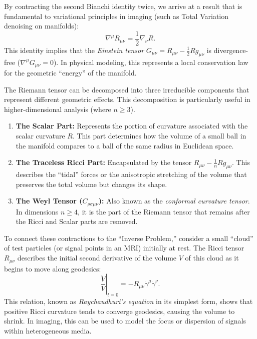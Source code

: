 By contracting the second Bianchi identity twice, we arrive at a result that is fundamental to variational principles in imaging (such as Total Variation denoising on manifolds):
\begin{equation}
  \nabla^\mu R_{\mu\nu} = \frac{1}{2} \nabla_\nu R
.\end{equation}
This identity implies that the \emph{Einstein tensor} $G_{\mu\nu} = R_{\mu\nu} - \frac{1}{2}Rg_{\mu\nu}$ is divergence-free ($\nabla^\mu G_{\mu\nu} = 0$). In physical modeling, this represents a local conservation law for the geometric ``energy'' of the manifold.

The Riemann tensor can be decomposed into three irreducible components that represent different geometric effects. This decomposition is particularly useful in higher-dimensional analysis (where $n \geq 3$).
\begin{enumerate}
  \item \textbf{The Scalar Part:} Represents the portion of curvature associated with the scalar curvature $R$. This part determines how the volume of a small ball in the manifold compares to a ball of the same radius in Euclidean space.

  \item \textbf{The Traceless Ricci Part:} Encapsulated by the tensor $R_{\mu\nu} - \frac{1}{n} R g_{\mu\nu}$. This describes the ``tidal'' forces or the anisotropic stretching of the volume that preserves the total volume but changes its shape.

  \item \textbf{The Weyl Tensor ($C_{\rho\sigma\mu\nu}$):} Also known as the \emph{conformal curvature tensor}. In dimensions $n \geq 4$, it is the part of the Riemann tensor that remains after the Ricci and Scalar parts are removed.
\end{enumerate}

To connect these contractions to the ``Inverse Problem,'' consider a small ``cloud'' of test particles (or signal points in an MRI) initially at rest. The Ricci tensor $R_{\mu\nu}$ describes the initial second derivative of the volume $V$ of this cloud as it begins to move along geodesics:
\begin{equation}
  \left. \frac{\ddot{V}}{V} \right\rvert_{t=0} = -R_{\mu\nu} \dot{\gamma}^\mu \dot{\gamma}^\nu
.\end{equation}
This relation, known as \emph{Raychaudhuri's equation} in its simplest form, shows that positive Ricci curvature tends to converge geodesics, causing the volume to shrink. In imaging, this can be used to model the focus or dispersion of signals within heterogeneous media.

